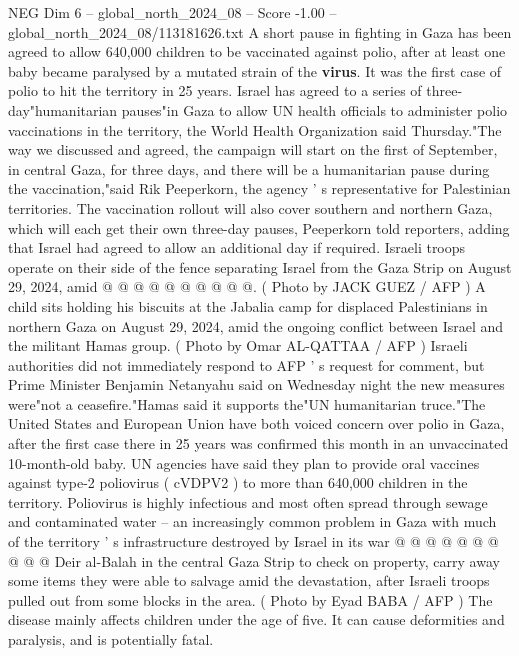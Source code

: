 \begin{textsample}{NEG Dim 6 – global\_north\_2024\_08 – Score -1.00 – global\_north\_2024\_08/113181626.txt}  \label{ex:f6_neg_070}
A short pause in fighting in Gaza has been agreed to allow 640,000 children to be vaccinated against polio, after at least one baby became paralysed by a mutated strain of the \textbf{virus}.
It was the first case of polio to hit the territory in 25 years.
Israel has agreed to a series of three-day"humanitarian pauses"in Gaza to allow UN health officials to administer polio vaccinations in the territory, the World Health Organization said Thursday."The way we discussed and agreed, the campaign will start on the first of September, in central Gaza, for three days, and there will be a humanitarian pause during the vaccination,"said Rik Peeperkorn, the agency ' s representative for Palestinian territories.
The vaccination rollout will also cover southern and northern Gaza, which will each get their own three-day pauses, Peeperkorn told reporters, adding that Israel had agreed to allow an additional day if required.
Israeli troops operate on their side of the fence separating Israel from the Gaza Strip on August 29, 2024, amid @ @ @ @ @ @ @ @ @ @. ( Photo by JACK GUEZ / AFP ) A child sits holding his biscuits at the Jabalia camp for displaced Palestinians in northern Gaza on August 29, 2024, amid the ongoing conflict between Israel and the militant Hamas group. ( Photo by Omar AL-QATTAA / AFP ) Israeli authorities did not immediately respond to AFP ' s request for comment, but Prime Minister Benjamin Netanyahu said on Wednesday night the new measures were"not a ceasefire."Hamas said it supports the"UN humanitarian truce."The United States and European Union have both voiced concern over polio in Gaza, after the first case there in 25 years was confirmed this month in an unvaccinated 10-month-old baby.
UN agencies have said they plan to provide oral vaccines against type-2 poliovirus ( cVDPV2 ) to more than 640,000 children in the territory.
Poliovirus is highly infectious and most often spread through sewage and contaminated water -- an increasingly common problem in Gaza with much of the territory ' s infrastructure destroyed by Israel in its war @ @ @ @ @ @ @ @ @ @ Deir al-Balah in the central Gaza Strip to check on property, carry away some items they were able to salvage amid the devastation, after Israeli troops pulled out from some blocks in the area. ( Photo by Eyad BABA / AFP ) The disease mainly affects children under the age of five.
It can cause deformities and paralysis, and is potentially fatal.

\end{textsample}
